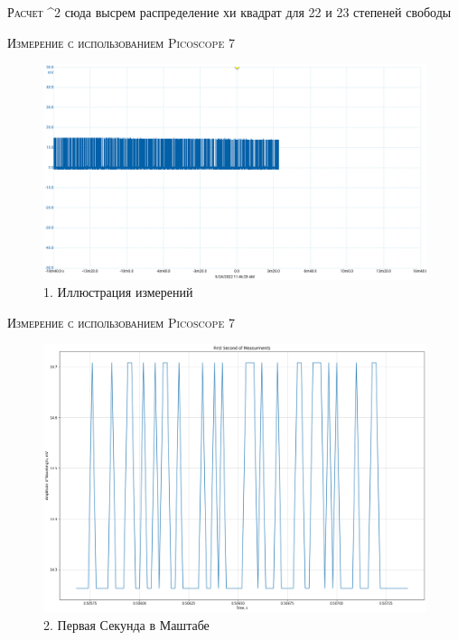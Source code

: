 \documentclass{beamer}%
\begin{document}
\begin{frame}{\textsc{Расчет} \chi^2}
    сюда высрем распределение хи квадрат для 22 и 23 степеней свободы
\end{frame}

\begin{frame}{\textsc{Измерение с использованием Picoscope 7}}
\begin{figure}
    \centering
    \includegraphics[scale=0.25]{images/Pictrue OF Measures.png}
    \caption{1. Иллюстрация измерений}
    \label{fig:my_label}
\end{figure}
\end{frame}    

\begin{frame}{\textsc{Измерение с использованием Picoscope 7}}
\begin{figure}
    \centering
    \includegraphics[scale=0.25]{images/outputGraph.png}
    \caption{2. Первая Секунда в Маштабе}
    \label{fig:my_label}
\end{figure}
\end{frame}   
\end{document}
